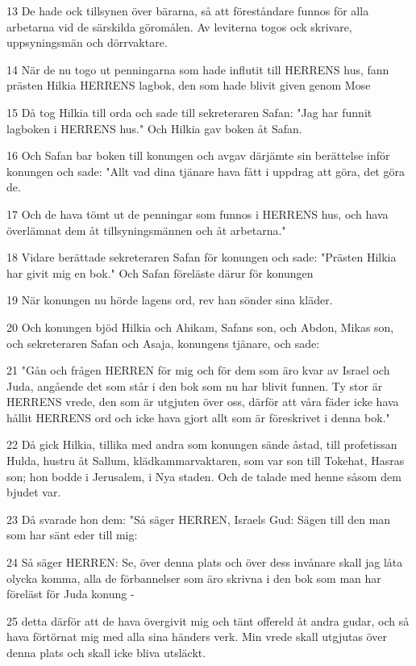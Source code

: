 \par 13 De hade ock tillsynen över bärarna, så att föreståndare funnos för alla arbetarna vid de särskilda göromålen. Av leviterna togos ock skrivare, uppsyningsmän och dörrvaktare.
\par 14 När de nu togo ut penningarna som hade influtit till HERRENS hus, fann prästen Hilkia HERRENS lagbok, den som hade blivit given genom Mose
\par 15 Då tog Hilkia till orda och sade till sekreteraren Safan: "Jag har funnit lagboken i HERRENS hus." Och Hilkia gav boken åt Safan.
\par 16 Och Safan bar boken till konungen och avgav därjämte sin berättelse inför konungen och sade: "Allt vad dina tjänare hava fått i uppdrag att göra, det göra de.
\par 17 Och de hava tömt ut de penningar som funnos i HERRENS hus, och hava överlämnat dem åt tillsyningsmännen och åt arbetarna."
\par 18 Vidare berättade sekreteraren Safan för konungen och sade: "Prästen Hilkia har givit mig en bok." Och Safan föreläste därur för konungen
\par 19 När konungen nu hörde lagens ord, rev han sönder sina kläder.
\par 20 Och konungen bjöd Hilkia och Ahikam, Safans son, och Abdon, Mikas son, och sekreteraren Safan och Asaja, konungens tjänare, och sade:
\par 21 "Gån och frågen HERREN för mig och för dem som äro kvar av Israel och Juda, angående det som står i den bok som nu har blivit funnen. Ty stor är HERRENS vrede, den som är utgjuten över oss, därför att våra fäder icke hava hållit HERRENS ord och icke hava gjort allt som är föreskrivet i denna bok."
\par 22 Då gick Hilkia, tillika med andra som konungen sände åstad, till profetissan Hulda, hustru åt Sallum, klädkammarvaktaren, som var son till Tokehat, Hasras son; hon bodde i Jerusalem, i Nya staden. Och de talade med henne såsom dem bjudet var.
\par 23 Då svarade hon dem: "Så säger HERREN, Israels Gud: Sägen till den man som har sänt eder till mig:
\par 24 Så säger HERREN: Se, över denna plats och över dess invånare skall jag låta olycka komma, alla de förbannelser som äro skrivna i den bok som man har föreläst för Juda konung -
\par 25 detta därför att de hava övergivit mig och tänt offereld åt andra gudar, och så hava förtörnat mig med alla sina händers verk. Min vrede skall utgjutas över denna plats och skall icke bliva utsläckt.
